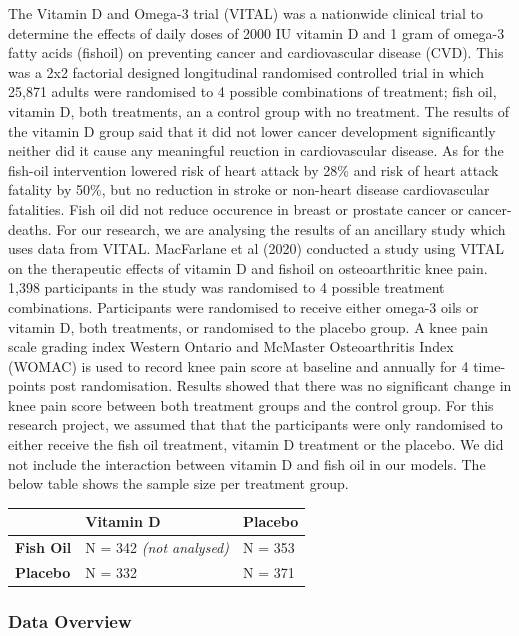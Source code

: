 \documentclass{article}
\begin{document}
The Vitamin D and Omega-3 trial (VITAL) was a nationwide clinical trial
to determine the effects of daily doses of 2000 IU vitamin D and 1 gram
of omega-3 fatty acids (fishoil) on preventing cancer and cardiovascular
disease (CVD). This was a 2x2 factorial designed longitudinal randomised
controlled trial in which 25,871 adults were randomised to 4 possible
combinations of treatment; fish oil, vitamin D, both treatments, an a
control group with no treatment. The results of the vitamin D group said
that it did not lower cancer development significantly neither did it
cause any meaningful reuction in cardiovascular disease. As for the
fish-oil intervention lowered risk of heart attack by 28\% and risk of
heart attack fatality by 50\%, but no reduction in stroke or non-heart
disease cardiovascular fatalities. Fish oil did not reduce occurence in
breast or prostate cancer or cancer-deaths. For our research, we are
analysing the results of an ancillary study which uses data from VITAL.
MacFarlane et al (2020) conducted a study using VITAL on the therapeutic
effects of vitamin D and fishoil on osteoarthritic knee pain. 1,398
participants in the study was randomised to 4 possible treatment
combinations. Participants were randomised to receive either omega-3
oils or vitamin D, both treatments, or randomised to the placebo group.
A knee pain scale grading index Western Ontario and McMaster
Osteoarthritis Index (WOMAC) is used to record knee pain score at
baseline and annually for 4 time-points post randomisation. Results
showed that there was no significant change in knee pain score between
both treatment groups and the control group. For this research project,
we assumed that that the participants were only randomised to either
receive the fish oil treatment, vitamin D treatment or the placebo. We
did not include the interaction between vitamin D and fish oil in our
models. The below table shows the sample size per treatment group.

\begin{longtable}[]{@{}lll@{}}
\toprule\noalign{}
& \textbf{Vitamin D} & \textbf{Placebo} \\
\midrule\noalign{}
\endhead
\bottomrule\noalign{}
\endlastfoot
\textbf{Fish Oil} & N = 342 \emph{(not analysed)} & N = 353 \\
\textbf{Placebo} & N = 332 & N = 371 \\
\end{longtable}

\subsubsection{Data Overview}\label{data-overview-1}
\end{document}
